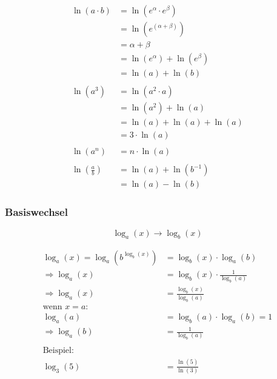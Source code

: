 \begin{align*}
	\ln(a \cdot b)   & = \ln(e^{\alpha} \cdot e^{\beta})  \\
	                 & = \ln(e^{(\alpha + \beta)})        \\
	                 & = \alpha + \beta                   \\
	                 & = \ln(e^{\alpha}) + \ln(e^{\beta}) \\
	                 & = \ln(a) + \ln (b)                 \\
	\\
	\ln(a^3)         & = \ln(a^2 \cdot a)                 \\
	                 & = \ln(a^2) + \ln(a)                \\
	                 & = \ln(a) + \ln(a) + \ln(a)         \\
	                 & = 3 \cdot \ln(a)                   \\
	\\
	\ln(a^n)         & = n \cdot \ln(a)                   \\
	\\
	\ln(\frac{a}{b}) & = \ln(a) + \ln(b^{-1})             \\
	                 & = \ln(a) - \ln(b)
\end{align*}

\subsubsection{Basiswechsel}
\[
	\log_a(x) \rightarrow \log_b(x)
\]

\begin{align*}
	\log_a(x) = \log_a\left(b^{\log_b(x)}\right)
	                      & = \log_b(x) \cdot \log_a(b)           \\
	\Rightarrow \log_a(x) & = \log_b(x) \cdot \frac{1}{\log_b(a)} \\
	\Rightarrow \log_a(x) & = \frac{\log_b(x)}{\log_b(a)}         \\
	\text{wenn \(x = a\):}                                        \\
	\log_a(a)             & = \log_b(a) \cdot \log_a(b) = 1       \\
	\Rightarrow \log_a(b) & = \frac{1}{\log_b(a)}                 \\
	\\
	\text{Beispiel:}                                              \\
	\log_3(5)             & = \frac{\ln(5)}{\ln(3)}
\end{align*}

